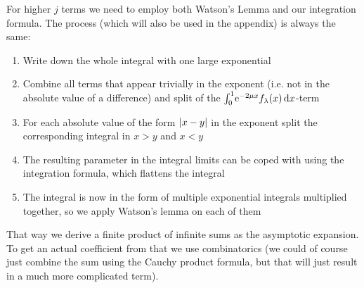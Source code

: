 For higher $j$ terms we need to employ both Watson's Lemma and our integration
formula. The process (which will also be used in the appendix) is always the
same:
\begin{enumerate}
  \item Write down the whole integral with one large exponential
  \item Combine all terms that appear trivially in the exponent (i.e. not in the
    absolute value of a difference) and split of the $\Int{x}{\Eto{-2\mu
    x}f_\lambda(x)}$-term
  \item For each absolute value of the form $\Abs{x-y}$ in the exponent split
    the corresponding integral in $x > y$ and $x < y$
  \item The resulting parameter in the integral limits can be coped with using
    the integration formula, which flattens the integral
  \item The integral is now in the form of multiple exponential integrals
    multiplied together, so we apply Watson's lemma on each of them
\end{enumerate}
That way we derive a finite product of infinite sums as the asymptotic
expansion. To get an actual coefficient from that we use combinatorics (we could
of course just combine the sum using the Cauchy product formula, but that will
just result in a much more complicated term).

